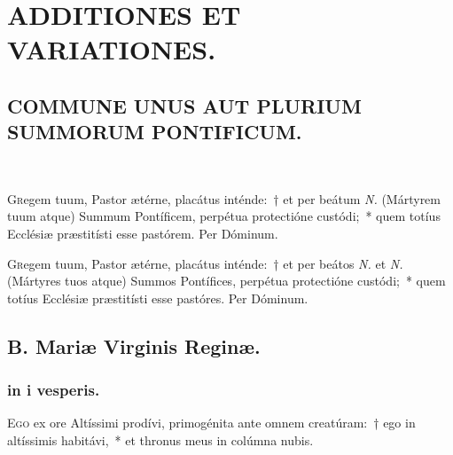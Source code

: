 \documentclass[vesperale_romanum.tex]{subfiles}
\begin{document}
\chapter[Additiones et Variationes.]{ADDITIONES ET VARIATIONES.}
\thispagestyle{empty}

\section[Commune Summorum Pontificum.]{COMMUNE UNUS AUT PLURIUM SUMMORUM PONTIFICUM.}

\


\lettrine{G}{r}egem tuum, Pastor ætérne, placátus inténde:~† et per beátum \textit{N.} (Mártyrem tuum atque) Summum Pontíficem, perpétua protectióne custódi;~* quem totíus Ecclésiæ præstitísti esse pastórem. Per Dóminum.


\lettrine{G}{r}egem tuum, Pastor ætérne, placátus inténde:~† et per beátos \textit{N.} et \textit{N.} (Mártyres tuos atque) Summos Pontífices, perpétua protectióne custódi;~* quem totíus Ecclésiæ præstitísti esse pastóres. Per Dóminum.

\newpage


\section{B. Mariæ Virginis Reginæ.} %


\subsection{in i vesperis.}



\lettrine{E}{go} ex ore Altíssimi prodívi, primogénita ante omnem creatúram:~† ego in altíssimis habitávi,~* et thronus meus in colúmna nubis.
\end{document}
